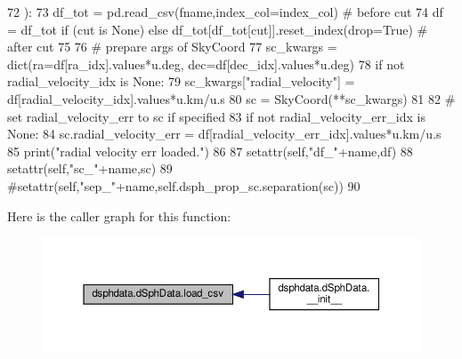 \begin{DoxyCode}
72                 ):
73         df\_tot = pd.read\_csv(fname,index\_col=index\_col)  \textcolor{comment}{# before cut}
74         df = df\_tot \textcolor{keywordflow}{if} (cut \textcolor{keywordflow}{is} \textcolor{keywordtype}{None}) \textcolor{keywordflow}{else} df\_tot[df\_tot[cut]].reset\_index(drop=\textcolor{keyword}{True})  \textcolor{comment}{# after cut}
75         
76         \textcolor{comment}{# prepare args of SkyCoord}
77         sc\_kwargs = dict(ra=df[ra\_idx].values*u.deg, dec=df[dec\_idx].values*u.deg)
78         \textcolor{keywordflow}{if} \textcolor{keywordflow}{not} radial\_velocity\_idx \textcolor{keywordflow}{is} \textcolor{keywordtype}{None}:
79             sc\_kwargs[\textcolor{stringliteral}{"radial\_velocity"}] = df[radial\_velocity\_idx].values*u.km/u.s
80         sc = SkyCoord(**sc\_kwargs)
81         
82         \textcolor{comment}{# set radial\_velocity\_err to sc if specified}
83         \textcolor{keywordflow}{if} \textcolor{keywordflow}{not} radial\_velocity\_err\_idx \textcolor{keywordflow}{is} \textcolor{keywordtype}{None}:
84             sc.radial\_velocity\_err = df[radial\_velocity\_err\_idx].values*u.km/u.s
85             print(\textcolor{stringliteral}{"radial velocity err loaded."})
86             
87         setattr(self,\textcolor{stringliteral}{"df\_"}+name,df)
88         setattr(self,\textcolor{stringliteral}{"sc\_"}+name,sc)
89         \textcolor{comment}{#setattr(self,"sep\_"+name,self.dsph\_prop\_sc.separation(sc))}
90 
\end{DoxyCode}
Here is the caller graph for this function\+:\nopagebreak
\begin{figure}[H]
\begin{center}
\leavevmode
\includegraphics[width=350pt]{d1/dbc/classdsphdata_1_1dSphData_a582365655d5493e34b14c2697e79c4fe_icgraph}
\end{center}
\end{figure}
\mbox{\label{classdsphdata_1_1dSphData_a5384bafd3c725eb6c324664c7b47eae1}} 
